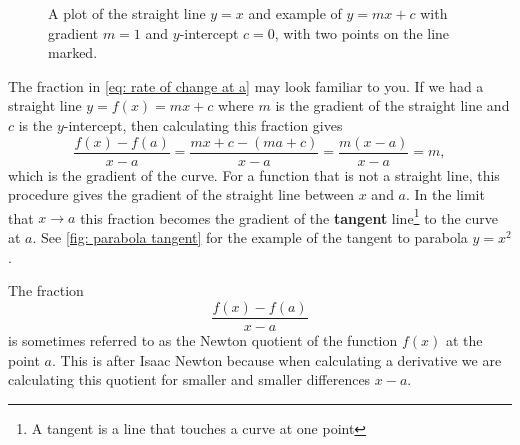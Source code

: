 \begin{figure}[ht]
    \centering
    \caption{A plot of the straight line $y=x$ and example of $y=mx+c$ with gradient $m=1$ and $y$-intercept $c=0$, with two points on the line marked.}
    \label{fig: straight line graph.}
\end{figure}

The fraction in \cref{eq: rate of change at a} may look familiar to you. If we had a straight line $y=f(x)=mx+c$ where $m$ is the gradient of the straight line and $c$ is the $y$-intercept, then calculating this fraction gives
\begin{equation*}
\frac{f(x)-f(a)}{x-a}=\frac{mx+c-(ma+c)}{x-a}=\frac{m(x-a)}{x-a}=m,
\end{equation*}
which is the gradient of the curve. For a function that is not a straight line, this procedure gives the gradient of the straight line between $x$ and $a$. In the limit that $x\to a$ this fraction becomes the gradient of the \textbf{tangent} line\footnote{A tangent is a line that touches a curve at one point} to the curve at $a$.   See \cref{fig: parabola tangent} for the example of the tangent to parabola $y=x^{2}$.


\begin{mdiv}
The fraction
\begin{equation*}
\frac{f(x)-f(a)}{x-a}
\end{equation*}
is sometimes referred to as the Newton quotient of the function $f(x)$ at the point $a$. This is after Isaac Newton because when calculating a derivative we are calculating this quotient for smaller and smaller differences $x-a$.
\end{mdiv}

